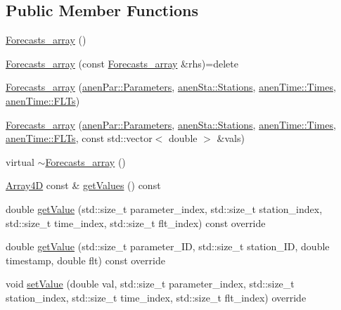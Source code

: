 \subsection*{Public Member Functions}
\begin{DoxyCompactItemize}
\item 
\mbox{\hyperlink{class_forecasts__array_a4304d0d78a0c475b3392c99e14c0891b}{Forecasts\+\_\+array}} ()
\item 
\mbox{\hyperlink{class_forecasts__array_a46a39594c6bc4f9b08ef3ff752147695}{Forecasts\+\_\+array}} (const \mbox{\hyperlink{class_forecasts__array}{Forecasts\+\_\+array}} \&rhs)=delete
\item 
\mbox{\hyperlink{class_forecasts__array_a7102efd52c1ed471ac9d05960e73e4a0}{Forecasts\+\_\+array}} (\mbox{\hyperlink{classanen_par_1_1_parameters}{anen\+Par\+::\+Parameters}}, \mbox{\hyperlink{classanen_sta_1_1_stations}{anen\+Sta\+::\+Stations}}, \mbox{\hyperlink{classanen_time_1_1_times}{anen\+Time\+::\+Times}}, \mbox{\hyperlink{classanen_time_1_1_f_l_ts}{anen\+Time\+::\+F\+L\+Ts}})
\item 
\mbox{\hyperlink{class_forecasts__array_ac50579e66269d92ebdbc4dc1ea07f7c8}{Forecasts\+\_\+array}} (\mbox{\hyperlink{classanen_par_1_1_parameters}{anen\+Par\+::\+Parameters}}, \mbox{\hyperlink{classanen_sta_1_1_stations}{anen\+Sta\+::\+Stations}}, \mbox{\hyperlink{classanen_time_1_1_times}{anen\+Time\+::\+Times}}, \mbox{\hyperlink{classanen_time_1_1_f_l_ts}{anen\+Time\+::\+F\+L\+Ts}}, const std\+::vector$<$ double $>$ \&vals)
\item 
virtual \mbox{\hyperlink{class_forecasts__array_a7e13cb82b1ab76a45946cff992c7fff4}{$\sim$\+Forecasts\+\_\+array}} ()
\item 
\mbox{\hyperlink{class_array4_d}{Array4D}} const  \& \mbox{\hyperlink{class_forecasts__array_afd9f8bb1e1736bf3665073d95ae5ef8c}{get\+Values}} () const
\item 
double \mbox{\hyperlink{class_forecasts__array_add3a617d4e63dba10bf369fe41714a24}{get\+Value}} (std\+::size\+\_\+t parameter\+\_\+index, std\+::size\+\_\+t station\+\_\+index, std\+::size\+\_\+t time\+\_\+index, std\+::size\+\_\+t flt\+\_\+index) const override
\item 
double \mbox{\hyperlink{class_forecasts__array_a38f7b890af0947e0d2022ce5bc5bb514}{get\+Value}} (std\+::size\+\_\+t parameter\+\_\+\+ID, std\+::size\+\_\+t station\+\_\+\+ID, double timestamp, double flt) const override
\item 
void \mbox{\hyperlink{class_forecasts__array_a19d59c93e8b7692ebae2d3e15dc43f87}{set\+Value}} (double val, std\+::size\+\_\+t parameter\+\_\+index, std\+::size\+\_\+t station\+\_\+index, std\+::size\+\_\+t time\+\_\+index, std\+::size\+\_\+t flt\+\_\+index) override

\end{DoxyCompactItemize}
